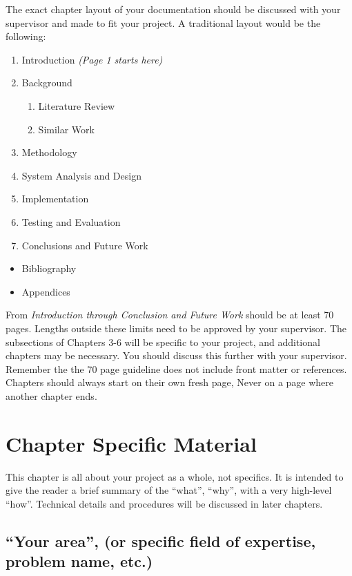 \documentclass{report}[a4paper,12pt,onecolumn]
\begin{document}
The exact chapter layout of your documentation should be discussed with your supervisor and made to fit your project. A traditional layout would be the following:
\begin{enumerate}
    \item Introduction \textit{(Page 1 starts here)}
    \item Background
    \begin{enumerate}
        \item Literature Review
        \item Similar Work
    \end{enumerate}
    \item Methodology
    \item System Analysis and Design
    \item Implementation
    \item Testing and Evaluation
    \item Conclusions and Future Work
\end{enumerate}
\begin{itemize}
    \item Bibliography
    \item Appendices
\end{itemize}

From \textit{Introduction through Conclusion and Future Work} should be at least 70 pages. Lengths outside these limits need to be approved by your supervisor. The subsections of Chapters 3-6 will be specific to your project, and additional chapters may be necessary. You should discuss this further with your supervisor. Remember the the 70 page guideline does not include front matter or references. Chapters should always start on their own fresh page, Never on a page where another chapter ends.

\section{Chapter Specific Material}

This chapter is all about your project as a whole, not specifics. It is intended to give the reader a brief summary of the ``what'', ``why'', with a very high-level ``how''. Technical details and procedures will be discussed in later chapters.

\subsection{``Your area'', (or specific field of expertise, problem name, etc.)}
\end{document}
